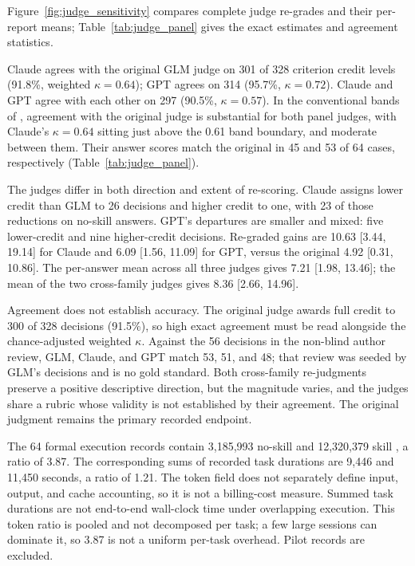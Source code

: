 \documentclass[11pt]{article}
\begin{document}
Figure~\ref{fig:judge_sensitivity} compares complete judge re-grades and their per-report means; Table~\ref{tab:judge_panel} gives the exact estimates and agreement statistics.




Claude agrees with the original GLM judge on 301 of 328 criterion credit levels (91.8\%, weighted $\kappa=0.64$); GPT agrees on 314 (95.7\%, $\kappa=0.72$). Claude and GPT agree with each other on 297 (90.5\%, $\kappa=0.57$). In the conventional bands of \citet{landis1977measurement}, agreement with the original judge is substantial for both panel judges, with Claude's $\kappa=0.64$ sitting just above the 0.61 band boundary, and moderate between them. Their answer scores match the original in 45 and 53 of 64 cases, respectively (Table~\ref{tab:judge_panel}).

The judges differ in both direction and extent of re-scoring. Claude assigns lower credit than GLM to 26 decisions and higher credit to one, with 23 of those reductions on no-skill answers. GPT's departures are smaller and mixed: five lower-credit and nine higher-credit decisions. Re-graded gains are 10.63 [3.44, 19.14] for Claude and 6.09 [1.56, 11.09] for GPT, versus the original 4.92 [0.31, 10.86]. The per-answer mean across all three judges gives 7.21 [1.98, 13.46]; the mean of the two cross-family judges gives 8.36 [2.66, 14.96].

Agreement does not establish accuracy. The original judge awards full credit to 300 of 328 decisions (91.5\%), so high exact agreement must be read alongside the chance-adjusted weighted $\kappa$. Against the 56 decisions in the non-blind author review, GLM, Claude, and GPT match 53, 51, and 48; that review was seeded by GLM's decisions and is no gold standard. Both cross-family re-judgments preserve a positive descriptive direction, but the magnitude varies, and the judges share a rubric whose validity is not established by their agreement. The original judgment remains the primary recorded endpoint.

The 64 formal execution records contain 3,185,993 no-skill and 12,320,379 skill , a ratio of 3.87. The corresponding sums of recorded task durations are 9,446 and 11,450 seconds, a ratio of 1.21. The token field does not separately define input, output, and cache accounting, so it is not a billing-cost measure. Summed task durations are not end-to-end wall-clock time under overlapping execution. This token ratio is pooled and not decomposed per task; a few large sessions can dominate it, so 3.87 is not a uniform per-task overhead. Pilot records are excluded.
\end{document}
